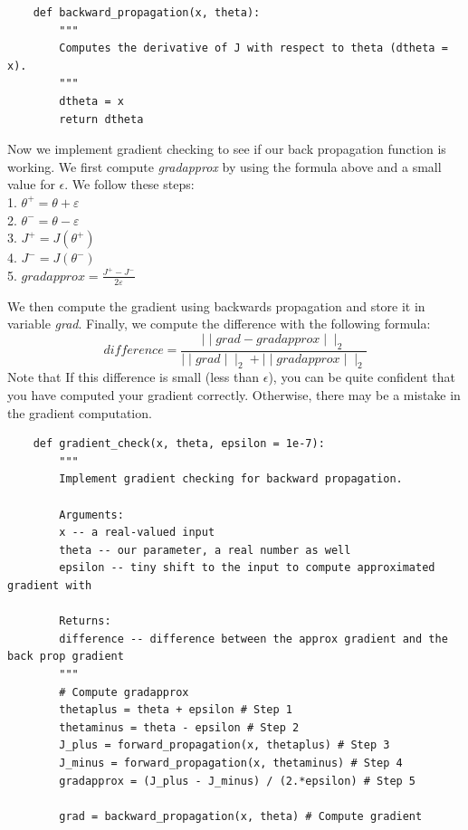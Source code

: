 \documentclass[11pt, a4paper]{article}
\begin{document}
\begin{spacing}{1.1}
\begin{lstlisting}
	def backward_propagation(x, theta):
		"""
		Computes the derivative of J with respect to theta (dtheta = x).
		"""
		dtheta = x		
		return dtheta \end{lstlisting} \vspace*{1mm}
	Now we implement gradient checking to see if our back propagation function is working. We first compute \textit{gradapprox} by using the formula above and a small value for $\epsilon$. We follow these steps: \vspace*{1mm} \\
	\hspace*{3mm} 1. $\theta^{+} = \theta + \varepsilon$ \\
	\hspace*{3mm} 2. $\theta^{-} = \theta - \varepsilon$\\
	\hspace*{3mm} 3. $J^{+} = J(\theta^{+})$\\
	\hspace*{3mm} 4. $J^{-} = J(\theta^{-})$\\
	\hspace*{3mm} 5. $gradapprox = \frac{J^{+} - J^{-}}{2  \varepsilon}$ \newpage

	\noindent We then compute the gradient using backwards propagation and store it in variable \textit{grad}. Finally, we compute the difference with the following formula: $$ difference = \frac {\mid\mid grad - gradapprox \mid\mid_2}{\mid\mid grad \mid\mid_2 + \mid\mid gradapprox \mid\mid_2}$$ Note that If this difference is small (less than $\epsilon$), you can be quite confident that you have computed your gradient correctly. Otherwise, there may be a mistake in the gradient computation.       
	\begin{lstlisting}
	def gradient_check(x, theta, epsilon = 1e-7):
		"""
		Implement gradient checking for backward propagation.
		
		Arguments:
		x -- a real-valued input
		theta -- our parameter, a real number as well
		epsilon -- tiny shift to the input to compute approximated gradient with
		
		Returns:
		difference -- difference between the approx gradient and the back prop gradient
		"""
		# Compute gradapprox
		thetaplus = theta + epsilon # Step 1
		thetaminus = theta - epsilon # Step 2
		J_plus = forward_propagation(x, thetaplus) # Step 3
		J_minus = forward_propagation(x, thetaminus) # Step 4
		gradapprox = (J_plus - J_minus) / (2.*epsilon) # Step 5
		
		grad = backward_propagation(x, theta) # Compute gradient
		

\end{lstlisting}
\end{spacing}
\end{document}
